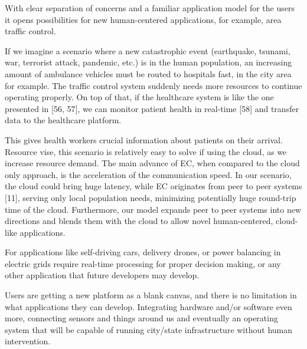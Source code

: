 With clear separation of concerns and a familiar application model for the users it opens possibilities for new human-centered applications, for example, area traffic control. 

If we imagine a scenario where a new catastrophic event (earthquake, tsunami, war, terrorist attack, pandemic, etc.) is in the human population, an increasing amount of ambulance vehicles must be routed to hospitals fast, in the city area for example. The traffic control system suddenly needs more resources to continue operating properly. On top of that, if the healthcare system is like the one presented in [56, 57], we can monitor patient health in real-time [58] and transfer data to the healthcare platform. 

This gives health workers crucial information about patients on their arrival. Resource vise, this scenario is relatively easy to solve if using the cloud, as we increase resource demand. The main advance of EC, when compared to the cloud only approach, is the acceleration of the communication speed. In our scenario, the cloud could bring huge latency, while EC originates from peer to peer systems [11], serving only local population needs, minimizing potentially huge round-trip time of the cloud. Furthermore, our model expands peer to peer systems into new directions and blends them with the cloud to allow novel human-centered, cloud-like applications. 

For applications like self-driving cars, delivery drones, or power balancing in electric grids require real-time processing for proper decision making, or any other application that future developers may develop.

Users are getting a new platform as a blank canvas, and there is no limitation in what applications they can develop. Integrating hardware and/or software even more, connecting sensors and things around us and eventually an operating system that will be capable of running city/state infrastructure without human intervention.
%
%